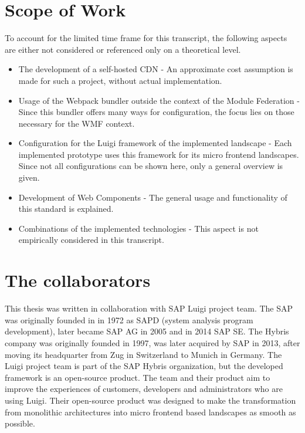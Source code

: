 \section{Scope of Work}

To account for the limited time frame for this transcript, the following aspects are either not considered or referenced only on a theoretical level.

\begin{itemize}
	\item The development of a self-hosted CDN - An approximate cost assumption is made for such a project, without actual implementation.
	\item Usage of the Webpack bundler outside the context of the Module Federation - Since this bundler offers many ways for configuration, the focus lies on those necessary for the WMF context.
	\item Configuration for the Luigi framework of the implemented landscape - Each implemented prototype uses this framework for its micro frontend landscapes. Since not all configurations can be shown here, only a general overview is given.
	\item Development of Web Components - The general usage and functionality of this standard is explained.
	\item Combinations of the implemented technologies - This aspect is not empirically considered in this transcript.
\end{itemize}

\section{The collaborators}

This thesis was written in collaboration with SAP Luigi project team. The SAP was originally founded in in 1972 as SAPD (system analysis program development), later became SAP AG in 2005 and in 2014 SAP SE. The Hybris company was originally founded in 1997, was later acquired by SAP in 2013, after moving its headquarter from Zug in Switzerland to Munich in Germany.\cite{sap_history} The Luigi project team is part of the SAP Hybris organization, but the developed framework is an open-source product. 
The team and their product aim to improve the experiences of customers, developers and administrators who are using Luigi. Their open-source product was designed to make the transformation from monolithic architectures into micro frontend based landscapes as smooth as possible. 

 
